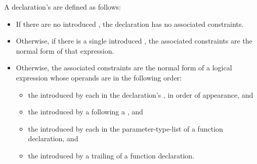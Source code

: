 \pnum
{}%
A declaration's  are defined as follows:

\begin{itemize}
\item If there are no introduced ,
the declaration has no associated constraints.

\item Otherwise, if there is a single introduced ,
the associated constraints are the normal form
of that expression.

\item Otherwise, the associated constraints are the normal form of a logical
 expression whose operands are in the
following order:
\begin{itemize}
\item
the  introduced by
each  in
the declaration's ,
in order of appearance, and

\item
the  introduced by
a  following
a , and

\item
the  introduced by
each  in
the parameter-type-list of a function declaration, and

\item
the  introduced by
a trailing  of
a function declaration.
\end{itemize}
\end{itemize}

